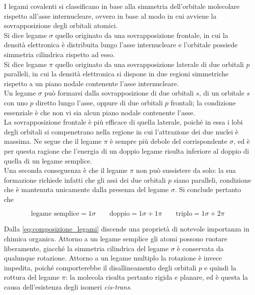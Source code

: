 I legami covalenti si classificano in base alla simmetria dell'orbitale molecolare rispetto all'asse internucleare, ovvero in base al modo in cui avviene la sovrapposizione degli orbitali atomici.\\

Si dice legame $\sigma$ quello originato da una sovrapposizione frontale, in cui la densità elettronica è distribuita lungo l'asse internucleare e l'orbitale possiede simmetria cilindrica rispetto ad esso.\\

Si dice legame $\pi$ quello originato da una sovrapposizione laterale di due orbitali $p$ paralleli, in cui la densità elettronica si dispone in due regioni simmetriche rispetto a un piano nodale contenente l'asse internucleare.\\

Un legame $\sigma$ può formarsi dalla sovrapposizione di due orbitali $s$, di un orbitale $s$ con uno $p$ diretto lungo l'asse, oppure di due orbitali $p$ frontali; la condizione essenziale è che non vi sia alcun piano nodale contenente l'asse.\\

La sovrapposizione frontale è più efficace di quella laterale, poiché in essa i lobi degli orbitali si compenetrano nella regione in cui l'attrazione dei due nuclei è massima. 
Ne segue che il legame $\pi$ è sempre più debole del corrispondente $\sigma$, ed è per questa ragione che l'energia di un doppio legame risulta inferiore al doppio di quella di un legame semplice.\\

Una seconda conseguenza è che il legame $\pi$ non può sussistere da solo: la sua formazione richiede infatti che gli assi dei due orbitali $p$ siano paralleli, condizione che è mantenuta unicamente dalla presenza del legame $\sigma$. Si conclude pertanto che

\begin{equation}
    \text{legame semplice} = 1\sigma \qquad
    \text{doppio} = 1\sigma + 1\pi \qquad
    \text{triplo} = 1\sigma + 2\pi
    \label{eq:composizione_legami}
\end{equation}

Dalla \eqref{eq:composizione_legami} discende una proprietà di notevole importanza in chimica organica. Attorno a un legame semplice gli atomi possono ruotare liberamente, giacché la simmetria cilindrica del legame $\sigma$ è conservata da qualunque rotazione. 
Attorno a un legame multiplo la rotazione è invece impedita, poiché comporterebbe il disallineamento degli orbitali $p$ e quindi la rottura del legame $\pi$: la molecola risulta pertanto rigida e planare, ed è questa la causa dell'esistenza degli isomeri \emph{cis-trans}.\\

